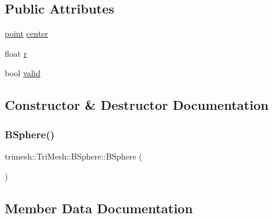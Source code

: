 \subsection*{Public Attributes}
\begin{DoxyCompactItemize}
\item 
\hyperlink{namespacetrimesh_a325b99fd6454b22fa4c4bc3223271b2c}{point} \hyperlink{structtrimesh_1_1TriMesh_1_1BSphere_a5408bf27a368120385d90f2891f977df}{center}
\item 
float \hyperlink{structtrimesh_1_1TriMesh_1_1BSphere_a9d06cee2284cf345cd9945d9c5117168}{r}
\item 
bool \hyperlink{structtrimesh_1_1TriMesh_1_1BSphere_a760a7c7c03f40f660e11d6b9b4bb4183}{valid}
\end{DoxyCompactItemize}


\subsection{Constructor \& Destructor Documentation}
\mbox{\label{structtrimesh_1_1TriMesh_1_1BSphere_acb25debfbc4ba199c73f1dd8b802e9d9}} 
\subsubsection{\texorpdfstring{B\+Sphere()}{BSphere()}}
{\footnotesize\ttfamily trimesh\+::\+Tri\+Mesh\+::\+B\+Sphere\+::\+B\+Sphere (\begin{DoxyParamCaption}{ }\end{DoxyParamCaption})\hspace{0.3cm}{\ttfamily [inline]}}



\subsection{Member Data Documentation}
\mbox{\label{structtrimesh_1_1TriMesh_1_1BSphere_a5408bf27a368120385d90f2891f977df}} 
